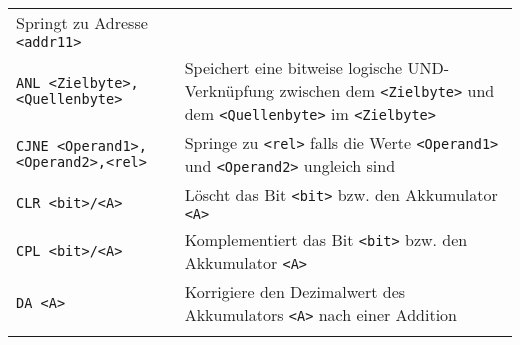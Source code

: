 \begin{longtable}[c]{@{}ll@{}}
\begin{minipage}[t]{0.69\columnwidth}
Springt zu Adresse \texttt{<addr11>}
\strut\end{minipage}\tabularnewline
\begin{minipage}[t]{0.25\columnwidth}\raggedright\strut
\texttt{ANL <Zielbyte>, <Quellenbyte>}
\strut\end{minipage} & \begin{minipage}[t]{0.69\columnwidth}\raggedright\strut
Speichert eine bitweise logische UND-Verknüpfung zwischen dem \texttt{<Zielbyte>} und dem
\texttt{<Quellenbyte>} im \texttt{<Zielbyte>}
\strut\end{minipage}\tabularnewline
\begin{minipage}[t]{0.25\columnwidth}\raggedright\strut
\texttt{CJNE <Operand1>,} \texttt{<Operand2>,<rel>}
\strut\end{minipage} & \begin{minipage}[t]{0.69\columnwidth}\raggedright\strut
Springe zu \texttt{<rel>} falls die Werte \texttt{<Operand1>} und \texttt{<Operand2>}
ungleich sind
\strut\end{minipage}\tabularnewline
\begin{minipage}[t]{0.25\columnwidth}\raggedright\strut
\texttt{CLR <bit>/<A>}
\strut\end{minipage} & \begin{minipage}[t]{0.69\columnwidth}\raggedright\strut
Löscht das Bit \texttt{<bit>} bzw. den Akkumulator \texttt{<A>}
\strut\end{minipage}\tabularnewline
\begin{minipage}[t]{0.25\columnwidth}\raggedright\strut
\texttt{CPL <bit>/<A>}
\strut\end{minipage} & \begin{minipage}[t]{0.69\columnwidth}\raggedright\strut
Komplementiert das Bit \texttt{<bit>} bzw. den Akkumulator \texttt{<A>}
\strut\end{minipage}\tabularnewline
\begin{minipage}[t]{0.25\columnwidth}\raggedright\strut
\texttt{DA <A>}
\strut\end{minipage} & \begin{minipage}[t]{0.69\columnwidth}\raggedright\strut
Korrigiere den Dezimalwert des Akkumulators \texttt{<A>} nach einer Addition
\strut\end{minipage}\tabularnewline
\begin{minipage}[t]{0.25\columnwidth}\raggedright\strut

\end{minipage}
\end{longtable}
